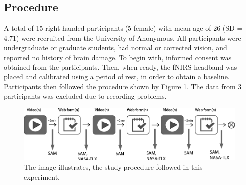 \documentclass[../main/Feedback.tex]{subfiles}
\begin{document}

\subsection{Procedure}
A total of 15 right handed participants (5 female) with mean age of 26 (SD = 4.71) were recruited from the University of Anonymous.
All participants were undergraduate or graduate students, had normal or corrected vision, and reported no history of brain damage. %
To begin with, informed consent was obtained from the participants. Then, when ready, the fNIRS headband was placed and calibrated using a period of rest, in order to obtain a baseline. Participants then followed the procedure shown by Figure \ref{fig:study-procedure}. The data from 3 participants was excluded due to recording problems.


\begin{figure}[h]
	\centering
	\includegraphics[width=\linewidth]{../figures/study-procedure}
	\caption[study procedure]{The image illustrates, the study procedure followed in this experiment.}
	\label{fig:study-procedure}
\end{figure}
\end{document}
